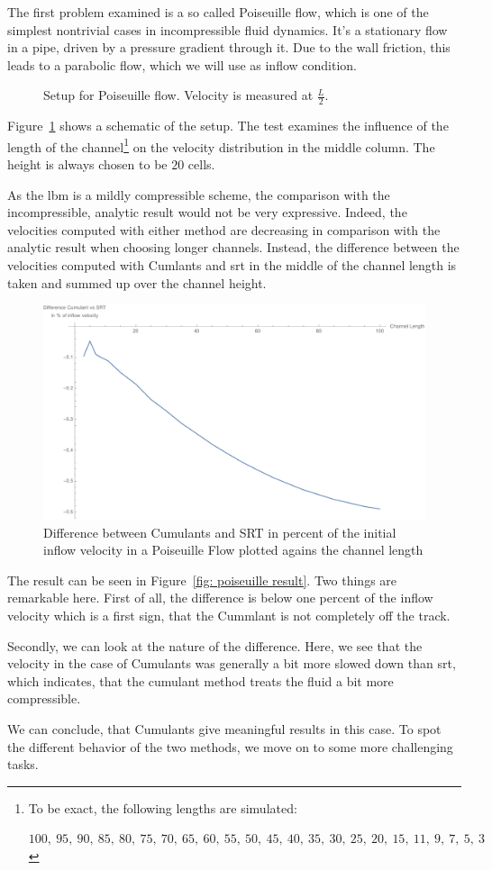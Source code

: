 The first problem examined is a so called Poiseuille flow, which is one of the simplest nontrivial cases in incompressible fluid dynamics.
It's a stationary flow in a pipe, driven by a pressure gradient through it.
Due to the wall friction, this leads to a parabolic flow, which we will use as inflow condition.

\begin{figure}
  \centering
  
  \caption{Setup for Poiseuille flow. Velocity is measured at $\frac{L}{2}$.}
\label{fig: poiseuille}
\end{figure}

Figure~\ref{fig: poiseuille} shows a schematic of the setup.
The test examines the influence of the length of the channel\footnote{To be exact, the following lengths are simulated:\par
 $100,\ 95,\ 90,\ 85,\ 80,\ 75,\ 70,\ 65,\ 60,\ 55,\ 50,\ 45,\ 40,\ 35,\ 30,\ 25,\ 20,\ 15,\ 11,\ 9,\ 7,\ 5,\ 3$
} on the velocity distribution in the middle column.
The height is always chosen to be $20$ cells.

As the \gls{lbm} is a mildly compressible scheme, the comparison with the incompressible, analytic result would not be very expressive.
Indeed, the velocities computed with either method are decreasing in comparison with the analytic result when choosing longer channels.
Instead, the difference between the velocities computed with Cumlants and \gls{srt} in the middle of the channel length is taken and summed up over the channel height.

\begin{figure}
  \centering
  \includegraphics[width=0.8\linewidth]{../figures/poiseuille.pdf} %
  \caption{Difference between Cumulants and SRT in percent of the initial inflow velocity in a Poiseuille Flow plotted agains the channel length}
\label{fig: poiseuille result}
\end{figure}

The result can be seen in Figure~\eqref{fig: poiseuille result}.
Two things are remarkable here.
First of all, the difference is below one percent of the inflow velocity which is a first sign, that the Cummlant is not completely off the track.

Secondly, we can look at the nature of the difference.
Here, we see that the velocity in the case of Cumulants was generally a bit more slowed down than \gls{srt}, which indicates, that the cumulant method treats the fluid a bit more compressible.

We can conclude, that Cumulants give meaningful results in this case.
To spot the different behavior of the two methods, we move on to some more challenging tasks.
